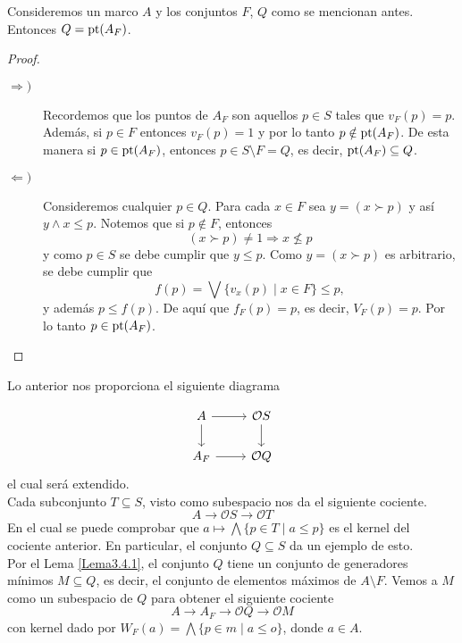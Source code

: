 \begin{lem}\label{Lema5.7.1}
    Consideremos un marco $A$ y los conjuntos $F$, $Q$ como se mencionan antes. Entonces $Q=\mathrm{pt}(A_F)$.
\end{lem}

\begin{proof}
\begin{description}
    \item[$\Rightarrow) $] Recordemos que los puntos de $A_F$ son aquellos $p\in S$ tales que $v_F(p)=p$. Además, si $p\in F$ entonces $v_F(p)=1$ y por lo tanto $p\notin \mathrm{pt}(A_F)$. De esta manera si $p\in \mathrm{pt}(A_F)$, entonces $p\in S\setminus F=Q$, es decir, $\mathrm{pt}(A_F)\subseteq Q$.
    
    \item[$\Leftarrow) $] Consideremos cualquier $p\in Q$. Para cada $x\in F$ sea $y=(x\succ p)$ y así $y\wedge x\leq p$. Notemos que si $p\notin F$, entonces
    \[
    (x\succ p)\neq 1\Rightarrow x\nleq p
    \]
    y como $p\in S$ se debe cumplir que $y\leq p$. Como $y=(x\succ p)$ es arbitrario, se debe cumplir que
    \[
    f(p)=\bigvee\{v_x(p)\mid x\in F\}\leq p,
    \]
    y además $p\leq f(p)$. De aquí que $f_F(p)=p$, es decir, $V_F(p)=p$. Por lo tanto $p \in \mathrm{pt}(A_F)$. 
    
\end{description}
\end{proof}

Lo anterior nos proporciona el siguiente diagrama

\[\begin{tikzcd}
	A & {\mathcal{O}S} \\
	{A_F} & {\mathcal{O}Q}
	\arrow[from=1-1, to=1-2]
	\arrow[from=1-1, to=2-1]
	\arrow[from=1-2, to=2-2]
	\arrow[from=2-1, to=2-2]
\end{tikzcd}\]
el cual será extendido.\\

Cada subconjunto $T\subseteq S$, visto como subespacio nos da el siguiente cociente.
\[
A\to \mathcal{O}S\to \mathcal{O}T
\]
En el cual se puede comprobar que $a\mapsto \bigwedge \{p\in T\mid a\leq p\}$ es el kernel del cociente anterior. En particular, el conjunto $Q\subseteq S$ da un ejemplo de esto.\\

Por el Lema \ref{Lema3.4.1}, el conjunto $Q$ tiene un conjunto de generadores mínimos $M\subseteq Q$, es decir, el conjunto de elementos máximos de $A\setminus F$. Vemos a $M$ como un subespacio de $Q$ para obtener el siguiente cociente
\[
A\to A_F \to \mathcal{O}Q \to \mathcal{O}M
\]
con kernel dado por $W_F(a)=\bigwedge \{p\in m\mid a\leq o\}$, donde $a\in A$. 


